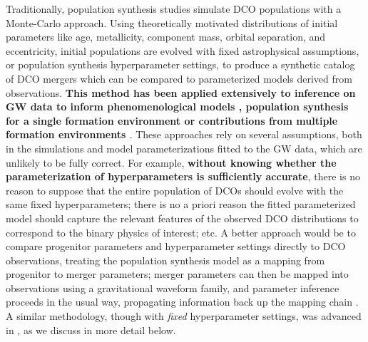\documentclass[linenumbers,twocolumn]{aastex631}
\begin{document}
Traditionally, population synthesis studies simulate DCO populations with a
Monte-Carlo approach. Using theoretically motivated distributions of initial
parameters like age, metallicity, component mass, orbital separation, and
eccentricity, initial populations are evolved with fixed astrophysical
assumptions, or population synthesis hyperparameter settings, to produce a
synthetic catalog of DCO mergers which can be compared to parameterized models
derived from observations. \textbf{This method has been applied extensively to
inference on GW data to inform phenomenological models
\citep[e.g.][]{Fishbach2017, Wysocki2019, Callister2021, Delfavero2021,
Farah2022, Delfavero2022}, population synthesis for a single formation
environment \citep[e.g.][]{Belczynski2016, Stevenson2017b, Taylor2018,
Barrett2018, Mastrogiovanni2022} or contributions from multiple formation
environments \citep[e.g][]{Zevin2017, Stevenson2017, Bouffanais2019, Zevin2021,
Wong2021, Bouffanais2021, Mapelli2022}}. These approaches rely on several
assumptions, both in the simulations and model parameterizations fitted to the
GW data, which are unlikely to be fully correct. For example, \textbf{without
knowing whether the parameterization of hyperparameters is sufficiently
accurate}, there is no reason to suppose that the entire population of DCOs
should evolve with the same fixed hyperparameters; there is no a priori reason
the fitted parameterized model should capture the relevant features of the
observed DCO distributions to correspond to the binary physics of interest; etc.
A better approach would be to compare progenitor parameters and hyperparameter
settings directly to DCO observations, treating the population synthesis model
as a mapping from progenitor to merger parameters; merger parameters can then be
mapped into observations using a gravitational waveform family, and parameter
inference proceeds in the usual way, propagating information back up the mapping
chain \citep[e.g.][]{Veitch2015}.  A similar methodology, though with
\emph{fixed} hyperparameter settings, was advanced in
\citet{Andrews2018,Andrews2021}, as we discuss in more detail below.
\end{document}
